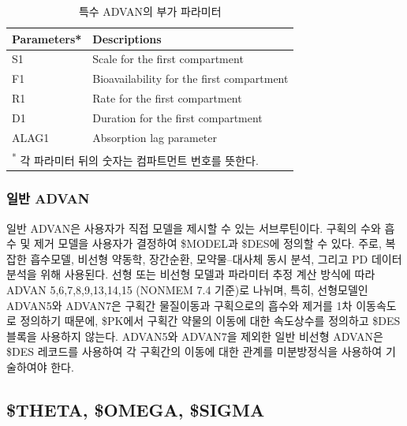\documentclass[
  11pt,
  krantz2, a4paper, twoside]{krantz}
\theoremstyle{definition}
\theoremstyle{definition}
\theoremstyle{definition}
\theoremstyle{remark}
\begin{document}
\begin{table}[!h]

\caption{\label{tab:advan-param}특수 ADVAN의 부가 파라미터}
\centering
\begin{tabular}[t]{ll}
\toprule
Parameters* & Descriptions\\
\midrule
\rowcolor{gray!6}  S1 & Scale for the first compartment\\
F1 & Bioavailability for the first compartment\\
\rowcolor{gray!6}  R1 & Rate for the first compartment\\
D1 & Duration for the first compartment\\
\rowcolor{gray!6}  ALAG1 & Absorption lag parameter\\
\bottomrule
\multicolumn{2}{l}{\textsuperscript{*} 각 파라미터 뒤의 숫자는 컴파트먼트 번호를 뜻한다.}\\
\end{tabular}
\end{table}


\hypertarget{uxc77cuxbc18-advan}{%
\subsubsection{일반 ADVAN}\label{uxc77cuxbc18-advan}}

일반 ADVAN은 사용자가 직접 모델을 제시할 수 있는 서브루틴이다. 구획의 수와 흡수 및 제거 모델을 사용자가 결정하여 \$MODEL과 \$DES에 정의할 수 있다. 주로, 복잡한 흡수모델, 비선형 약동학, 장간순환, 모약물--대사체 동시 분석, 그리고 PD 데이터 분석을 위해 사용된다. 선형 또는 비선형 모델과 파라미터 추정 계산 방식에 따라 ADVAN 5,6,7,8,9,13,14,15 (NONMEM 7.4 기준)로 나뉘며, 특히, 선형모델인 ADVAN5와 ADVAN7은 구획간 물질이동과 구획으로의 흡수와 제거를 1차 이동속도로 정의하기 때문에, \$PK에서 구획간 약물의 이동에 대한 속도상수를 정의하고 \$DES 블록을 사용하지 않는다. ADVAN5와 ADVAN7을 제외한 일반 비선형 ADVAN은 \$DES 레코드를 사용하여 각 구획간의 이동에 대한 관계를 미분방정식을 사용하여 기술하여야 한다.

\hypertarget{theta-omega-sigma}{%
\subsection{\$THETA, \$OMEGA, \$SIGMA}\label{theta-omega-sigma}}
\end{document}
